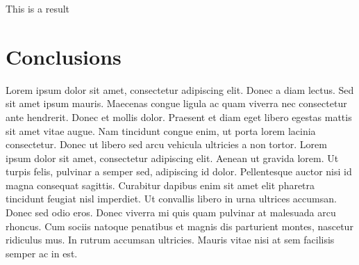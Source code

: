 \documentclass[a0, 30pt]{sciposter}
\begin{document}
\begin{multicols}{2}
  
  \usualsep\usualsep\usualsep
  \begin{center}
  \end{center}
  
  \usualsep\usualsep
  \begin{minipage}{0.2\textwidth}
    \centering
     This is a result
  \end{minipage}
  \begin{minipage}{0.3\textwidth}
  \end{minipage}
  
  \section{Conclusions}
  
  Lorem ipsum dolor sit amet, consectetur adipiscing elit. Donec a
  diam lectus. Sed sit amet ipsum mauris. Maecenas congue ligula ac
  quam viverra nec consectetur ante hendrerit. Donec et mollis
  dolor. Praesent et diam eget libero egestas mattis sit amet vitae
  augue. Nam tincidunt congue enim, ut porta lorem lacinia
  consectetur. Donec ut libero sed arcu vehicula ultricies a non
  tortor. Lorem ipsum dolor sit amet, consectetur adipiscing
  elit. Aenean ut gravida lorem. Ut turpis felis, pulvinar a semper
  sed, adipiscing id dolor. Pellentesque auctor nisi id magna
  consequat sagittis. Curabitur dapibus enim sit amet elit pharetra
  tincidunt feugiat nisl imperdiet. Ut convallis libero in urna
  ultrices accumsan. Donec sed odio eros. Donec viverra mi quis quam
  pulvinar at malesuada arcu rhoncus. Cum sociis natoque penatibus et
  magnis dis parturient montes, nascetur ridiculus mus. In rutrum
  accumsan ultricies. Mauris vitae nisi at sem facilisis semper ac in
  est.
  
  
  
\end{multicols}
\end{document}
